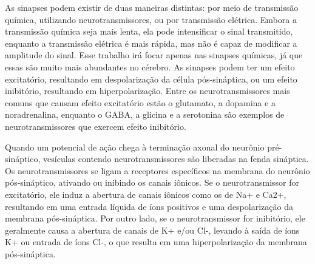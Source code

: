 
As sinapses podem existir de duas maneiras distintas: por meio de transmissão química, utilizando neurotransmissores, ou por
transmissão elétrica. Embora a transmissão química seja mais lenta, ela pode intensificar o sinal transmitido, enquanto a
transmissão elétrica é mais rápida, mas não é capaz de modificar a amplitude do sinal. Esse trabalho irá focar apenas nas sinapses químicas, 
já que essas são muito mais abundantes no cérebro. As sinapses podem ter um efeito
excitatório, resultando em despolarização da célula pós-sináptica, ou um efeito inibitório, resultando em hiperpolarização. Entre
os neurotransmissores mais comuns que causam efeito excitatório estão o glutamato, a dopamina e a noradrenalina, enquanto o GABA,
a glicina e a serotonina são exemplos de neurotransmissores que exercem efeito inibitório.

Quando um potencial de ação chega à terminação axonal do neurônio pré-sináptico, vesículas contendo neurotransmissores são
liberadas na fenda sináptica. Os neurotransmissores se ligam a receptores específicos na membrana do neurônio pós-sináptico,
ativando ou inibindo os canais iônicos. Se o neurotransmissor for excitatório, ele induz a abertura de canais iônicos como os de
Na+ e Ca2+, resultando em uma entrada líquida de íons positivos e uma despolarização da membrana pós-sináptica. Por outro lado, se
o neurotransmissor for inibitório, ele geralmente causa a abertura de canais de K+ e/ou Cl-, levando à saída de íons K+ ou entrada
de íons Cl-, o que resulta em uma hiperpolarização da membrana pós-sináptica.